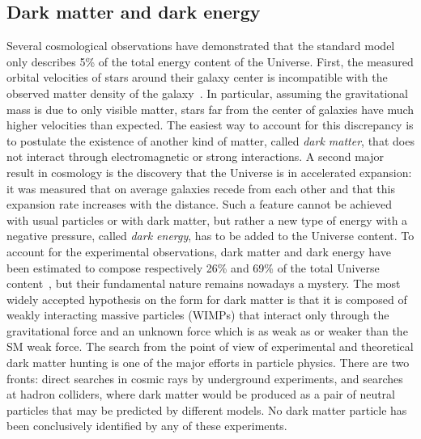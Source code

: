 \subsection*{Dark matter and dark energy}

Several cosmological observations have demonstrated that the standard model only describes 5\% of the total energy content of the Universe.
First, the measured orbital velocities of stars around their galaxy center is incompatible with the observed matter density of the galaxy~\cite{DarkMatterRubin,Iocco:2015xga}.
In particular, assuming the gravitational mass is due to only visible matter, stars far from the center of galaxies have much higher velocities than expected. %
The easiest way to account for this discrepancy is to postulate the existence of another kind of matter, called \textit{dark matter}, that does not interact through electromagnetic or strong interactions.
A second major result in cosmology is the discovery that the Universe is in accelerated expansion: it was measured that on average galaxies recede from each other and that this expansion rate increases with the distance.
Such a feature cannot be achieved with usual particles or with dark matter, but rather a new type of energy with a negative pressure, called \textit{dark energy}, has to be added to the Universe content.
To account for the experimental observations, dark matter and dark energy have been estimated to compose respectively 26\% and 69\% of the total Universe content~\cite{Ade:2015xua}, but their fundamental nature remains nowadays a mystery.
The most widely accepted hypothesis on the form for dark matter is that it is composed of weakly interacting massive particles (WIMPs) that interact only through the gravitational force and an unknown force which is as weak as or weaker than the SM weak force.
The search from the point of view of experimental and theoretical dark matter hunting is one of the major efforts in particle physics.
There are two fronts: direct searches in cosmic rays by underground experiments, and searches at hadron colliders, where dark matter would be produced as a pair of neutral particles that may be predicted by different models.
No dark matter particle has been conclusively identified by any of these experiments.


